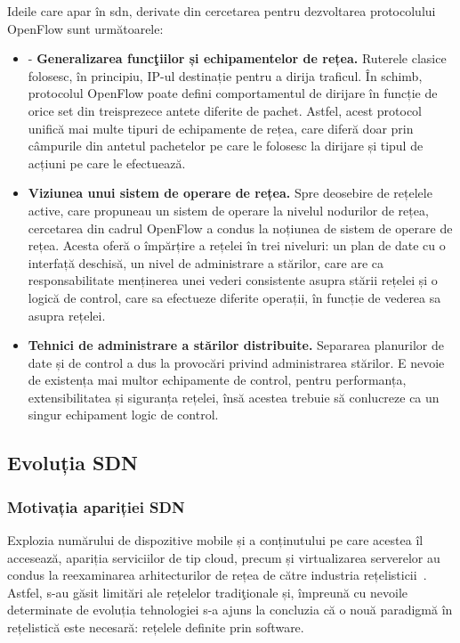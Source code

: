 Ideile care apar în \gls{sdn}, derivate din cercetarea pentru dezvoltarea protocolului OpenFlow sunt următoarele:
\begin{itemize}
	\item -	\textbf{Generalizarea funcţiilor și echipamentelor de rețea.} Ruterele clasice folosesc, în principiu, IP-ul destinație pentru a dirija traficul. În schimb, protocolul OpenFlow poate defini comportamentul de dirijare în funcție de orice set din treisprezece antete diferite de pachet. Astfel, acest protocol unifică mai multe tipuri de echipamente de rețea, care diferă doar prin câmpurile din antetul pachetelor pe care le folosesc la dirijare și tipul de acțiuni pe care le efectuează.
	\item \textbf{Viziunea unui sistem de operare de rețea.} Spre deosebire de rețelele active, care propuneau un sistem de operare la nivelul nodurilor de rețea, cercetarea din cadrul OpenFlow a condus la noțiunea de sistem de operare de rețea. Acesta oferă o împărțire a rețelei în trei niveluri: un plan de date cu o interfață deschisă, un nivel de administrare a stărilor, care are ca responsabilitate menținerea unei vederi consistente asupra stării rețelei și o logică de control, care sa efectueze diferite operații, în funcție de vederea sa asupra rețelei.
	\item \textbf{Tehnici de administrare a stărilor distribuite.} Separarea planurilor de date și de control a dus la provocări privind administrarea stărilor. E nevoie de existența mai multor echipamente de control, pentru performanța, extensibilitatea și siguranța rețelei, însă acestea trebuie să conlucreze ca un singur echipament logic de control.
\end{itemize}


\subsection{Evoluția SDN}

\subsubsection{Motivația apariției SDN}

Explozia numărului de dispozitive mobile și a conținutului pe care acestea îl accesează, apariția serviciilor de tip cloud, precum și virtualizarea serverelor au condus la reexaminarea arhitecturilor de rețea de către industria rețelisticii~\cite{ome2012software}. Astfel, s-au găsit limitări ale rețelelor tradiţionale și, împreună cu nevoile determinate de evoluția tehnologiei s-a ajuns la concluzia că o nouă paradigmă în rețelistică este necesară: rețelele definite prin software.

